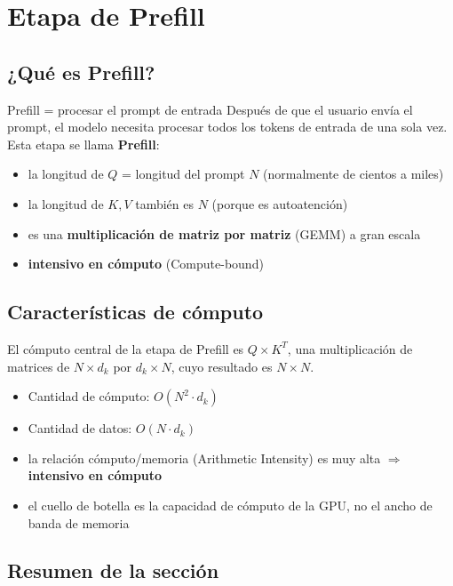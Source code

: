 \documentclass[a4paper]{article}
\begin{document}
\section{Etapa de Prefill}

\subsection{¿Qué es Prefill?}

\begin{importantbox}{Prefill = procesar el prompt de entrada}
Después de que el usuario envía el prompt, el modelo necesita procesar todos los tokens de entrada de una sola vez. Esta etapa se llama \textbf{Prefill}:
\begin{itemize}
  \item la longitud de $Q$ = longitud del prompt $N$ (normalmente de cientos a miles)
  \item la longitud de $K, V$ también es $N$ (porque es autoatención)
  \item es una \textbf{multiplicación de matriz por matriz} (GEMM) a gran escala
  \item \textbf{intensivo en cómputo} (Compute-bound)
\end{itemize}
\end{importantbox}

\subsection{Características de cómputo}

El cómputo central de la etapa de Prefill es $Q \times K^T$, una multiplicación de matrices de $N \times d_k$ por $d_k \times N$, cuyo resultado es $N \times N$.

\begin{itemize}
  \item Cantidad de cómputo: $O(N^2 \cdot d_k)$
  \item Cantidad de datos: $O(N \cdot d_k)$
  \item la relación cómputo/memoria (Arithmetic Intensity) es muy alta $\Rightarrow$ \textbf{intensivo en cómputo}
  \item el cuello de botella es la capacidad de cómputo de la GPU, no el ancho de banda de memoria
\end{itemize}

\subsection{Resumen de la sección}
\end{document}
